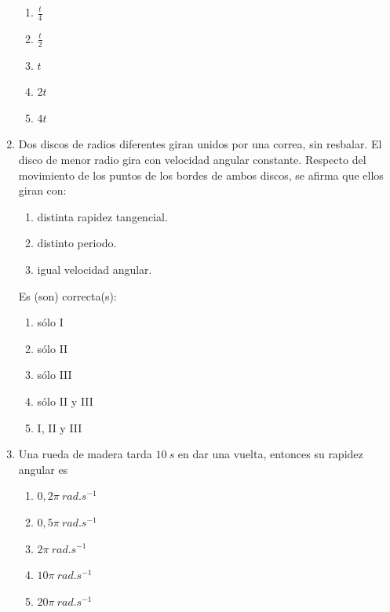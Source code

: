 \documentclass[letterpaper]{article}
\begin{document}
\begin{enumerate}
\begin{figure}[h]
\end{figure}

\begin{enumerate}[label=\Alph*)]
\item $\frac{t}{4}$
\item $\frac{t}{2}$
\item $t$
\item $2t$
\item $4t$
\end{enumerate}

\item Dos discos de radios diferentes giran unidos por una correa, sin resbalar. El disco de menor radio gira con velocidad angular constante. Respecto del movimiento de los puntos de los bordes de ambos discos, se afirma que ellos giran con:

\begin{figure}[h]
\centering
{}
\end{figure}

\begin{enumerate}[label=\Roman*)]
\item distinta rapidez tangencial.
\item distinto periodo.
\item igual velocidad angular.
\end{enumerate}

Es (son) correcta(s):
\begin{enumerate}[label=\Alph*)]
\item sólo I
\item sólo II
\item sólo III
\item sólo II y III
\item I, II y III
\end{enumerate}

\item Una rueda de madera tarda $10\ \si{s}$ en dar una vuelta, entonces su rapidez angular es
\begin{enumerate}[label=\Alph*)]
\item $0,2\pi\ \si{rad.s^{-1}}$
\item $0,5\pi\ \si{rad.s^{-1}}$
\item $2\pi\ \si{rad.s^{-1}}$
\item $10\pi\ \si{rad.s^{-1}}$
\item $20\pi\ \si{rad.s^{-1}}$
\end{enumerate}


\end{enumerate}
\end{document}
